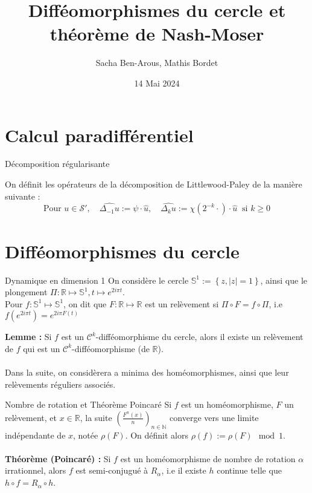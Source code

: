 \documentclass[10pt]{beamer}
\title{Difféomorphismes du cercle et théorème de Nash-Moser}
\date{14 Mai 2024}
\author{Sacha Ben-Arous, Mathis Bordet}
\institute{ENS Paris-Saclay}
\begin{document}
  \maketitle
\begin{frame}
\tableofcontents
\end{frame}  

\section{Calcul paradifférentiel}

\begin{frame}{Décomposition régularisante}

On définit les opérateurs de la décomposition de Littlewood-Paley de la manière suivante :
\[
\text{Pour } u \in \mathcal{S}', \quad \widehat{\Delta_{-1} u} := \psi \cdot \hat{u}, \quad \widehat{\Delta_{k} u} := \chi(2^{-k} \cdot) \cdot \hat{u} \ \text{ si } k \geq 0
\]

\end{frame}


\section{Difféomorphismes du cercle}
\begin{frame}{Dynamique en dimension 1}
    On considère le cercle $\mathbb{S}^1 := \left\{z, |z|=1 \right\}$, ainsi que le plongement $\Pi : \mathbb{R} \mapsto \mathbb{S}^1, t \mapsto e^{2i\pi t}$. \\
    
Pour $f:\mathbb{S}^1 \mapsto \mathbb{S}^1$, on dit que $F: \mathbb{R} \mapsto \mathbb{R}$ est un relèvement si $\Pi \circ F = f \circ \Pi$, i.e $f(e^{2i\pi t}) = e^{2i\pi F(t)}$

\textbf{Lemme :} Si $f$ est un $\mathcal{C}^k$-difféomorphisme du cercle, alors il existe un relèvement de $f$ qui est un $\mathcal{C}^k$-difféomorphisme (de $\mathbb{R}$). \\~\\

Dans la suite, on considèrera a minima des homéomorphismes, ainsi que leur relèvements réguliers associés.
\end{frame}

\begin{frame}{Nombre de rotation et Théorème Poincaré }
    Si $f$ est un homéomorphisme, $F$ un relèvement, et $x\in \mathbb{R}$, la suite $\displaystyle (\frac{F^n(x)}{n})_{n\in \mathbb{N}}$ converge vers une limite indépendante de $x$, notée $\rho(F)$. On définit alors $\rho(f):= \rho(F) \mod 1$. \\~\\
   

\textbf{Théorème (Poincaré) :} Si $f$ est un homéomorphisme de nombre de rotation $\alpha$ irrationnel, alors $f$ est semi-conjugué à $R_\alpha$, i.e il existe $h$ continue telle que $h \circ f = R_\alpha \circ h$. \\~\\

\end{frame}
\end{document}
